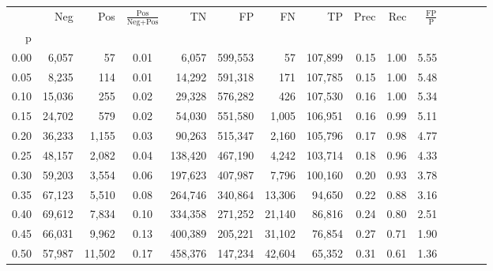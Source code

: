 \begin{tabular}{rrrcrrrrrrrrrrr}
\toprule
{} &     Neg &     Pos & $\frac{\text{Pos}}{\text{Neg}+\text{Pos}}$ &       TN &       FP &       FN &       TP &  Prec &   Rec & $\frac{\text{FP}}{\text{P}}$ \\
p    &         &         &                                            &          &          &          &          &       &       &                              \\
\midrule
0.00 &   6,057 &      57 &                                       0.01 &    6,057 &  599,553 &       57 &  107,899 &  0.15 &  1.00 &                         5.55 \\
0.05 &   8,235 &     114 &                                       0.01 &   14,292 &  591,318 &      171 &  107,785 &  0.15 &  1.00 &                         5.48 \\
0.10 &  15,036 &     255 &                                       0.02 &   29,328 &  576,282 &      426 &  107,530 &  0.16 &  1.00 &                         5.34 \\
0.15 &  24,702 &     579 &                                       0.02 &   54,030 &  551,580 &    1,005 &  106,951 &  0.16 &  0.99 &                         5.11 \\
0.20 &  36,233 &   1,155 &                                       0.03 &   90,263 &  515,347 &    2,160 &  105,796 &  0.17 &  0.98 &                         4.77 \\
0.25 &  48,157 &   2,082 &                                       0.04 &  138,420 &  467,190 &    4,242 &  103,714 &  0.18 &  0.96 &                         4.33 \\
0.30 &  59,203 &   3,554 &                                       0.06 &  197,623 &  407,987 &    7,796 &  100,160 &  0.20 &  0.93 &                         3.78 \\
0.35 &  67,123 &   5,510 &                                       0.08 &  264,746 &  340,864 &   13,306 &   94,650 &  0.22 &  0.88 &                         3.16 \\
0.40 &  69,612 &   7,834 &                                       0.10 &  334,358 &  271,252 &   21,140 &   86,816 &  0.24 &  0.80 &                         2.51 \\
0.45 &  66,031 &   9,962 &                                       0.13 &  400,389 &  205,221 &   31,102 &   76,854 &  0.27 &  0.71 &                         1.90 \\
0.50 &  57,987 &  11,502 &                                       0.17 &  458,376 &  147,234 &   42,604 &   65,352 &  0.31 &  0.61 &                         1.36 \\

\end{tabular}
